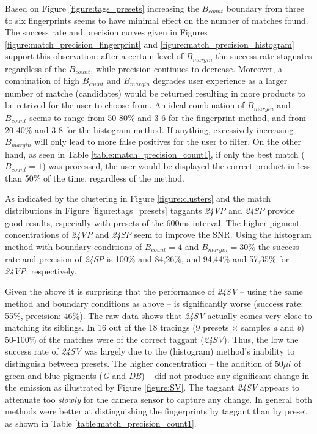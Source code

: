 \documentclass[thesis.tex]{subfiles}
\begin{document}
Based on Figure \ref{figure:tags_presets} increasing the $B_{count}$ boundary from three to six fingerprints seems to have minimal effect on the number of matches found. The success rate and precision curves given in Figures \ref{figure:match_precision_fingerprint} and \ref{figure:match_precision_histogram} support this observation: after a certain level of $B_{margin}$ the success rate stagnates regardless of the $B_{count}$, while precision continues to decrease. Moreover, a combination of high $B_{count}$ and $B_{margin}$ degrades user experience as a larger number of matche (candidates) would be returned resulting in more products to be retrived for the user to choose from. An ideal combination of $B_{margin}$ and $B_{count}$ seems to range from 50-80\% and 3-6 for the fingerprint method, and from 20-40\% and 3-8 for the histogram method. If anything, excessively increasing $B_{margin}$ will only lead to more false positives for the user to filter. On the other hand, as seen in Table \ref{table:match_precision_count1}, if only the best match ($B_{count} = 1$) was processed, the user would be displayed the correct product in less than 50\% of the time, regardless of the method.

As indicated by the clustering in Figure \ref{figure:clusters} and the match distributions in Figure \ref{figure:tags_presets} taggants \emph{24VP} and \emph{24SP} provide good results, especially with presets of the 600ms interval. The higher pigment concentrations of \emph{24VP} and \emph{24SP} seem to improve the SNR. Using the histogram method with boundary conditions of $B_{count} = 4$ and $B_{margin} = 30\%$ the success rate and precision of \emph{24SP} is 100\% and 84,26\%, and 94,44\% and 57,35\% for \emph{24VP}, respectively.

Given the above it is surprising that the performance of \emph{24SV} -- using the same method and boundary conditions as above -- is significantly worse (success rate: 55\%, precision: 46\%). The raw data shows that \emph{24SV} actually comes very close to matching its siblings. In 16 out of the 18 tracings (9 presets $\times$ samples \emph{a} and \emph{b}) 50-100\% of the matches were of the correct taggant (\emph{24SV}). Thus, the low the success rate of \emph{24SV} was largely due to the (histogram) method's inability to distinguish between presets. The higher concentration -- the addition of $50\mu l$ of green and blue pigments (\emph{G} and \emph{DB}) -- did not produce any significant change in the emission as illustrated by Figure \ref{figure:SV}. The taggant \emph{24SV} appears to attenuate too \emph{slowly} for the camera sensor to capture any change. In general both methods were better at distinguishing the fingerprints by taggant than by preset as shown in Table \ref{table:match_precision_count1}.
\end{document}
